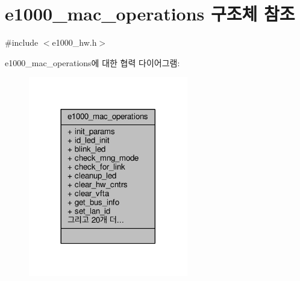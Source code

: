 \hypertarget{structe1000__mac__operations}{}\section{e1000\+\_\+mac\+\_\+operations 구조체 참조}
\label{structe1000__mac__operations}


{\ttfamily \#include $<$e1000\+\_\+hw.\+h$>$}



e1000\+\_\+mac\+\_\+operations에 대한 협력 다이어그램\+:
\nopagebreak
\begin{figure}[H]
\begin{center}
\leavevmode
\includegraphics[width=197pt]{structe1000__mac__operations__coll__graph}
\end{center}
\end{figure}
